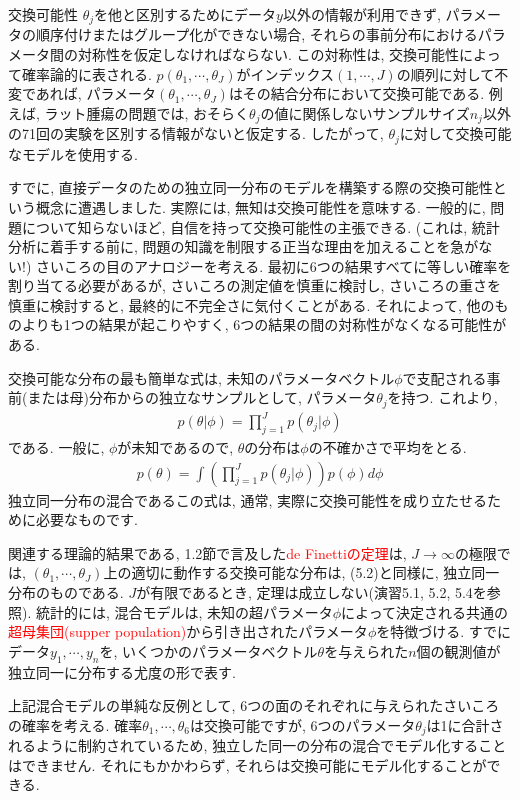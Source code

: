 \documentclass[10pt,dvipdfmx,a4]{beamer}
\newcommand{\eq}[1]{\begin{align}#1\end{align}}
\newcommand{\tcr}[1]{\textcolor{red}{#1}}
\begin{document}
\begin{frame}{交換可能性}
$\theta_j$を他と区別するためにデータ$y$以外の情報が利用できず, パラメータの順序付けまたはグループ化ができない場合, それらの事前分布におけるパラメータ間の対称性を仮定しなければならない.
この対称性は, 交換可能性によって確率論的に表される.
$p(\theta_1,\cdots,\theta_J)$がインデックス$(1,\cdots,J)$の順列に対して不変であれば, パラメータ$(\theta_1,\cdots,\theta_J)$はその結合分布において交換可能である.
例えば, ラット腫瘍の問題では, おそらく$\theta_j$の値に関係しないサンプルサイズ$n_j$以外の71回の実験を区別する情報がないと仮定する.
したがって, $\theta_j$に対して交換可能なモデルを使用する.

すでに, 直接データのための独立同一分布のモデルを構築する際の交換可能性という概念に遭遇しました.
実際には, 無知は交換可能性を意味する.
一般的に, 問題について知らないほど, 自信を持って交換可能性の主張できる.
(これは, 統計分析に着手する前に, 問題の知識を制限する正当な理由を加えることを急がない!)
さいころの目のアナロジーを考える.
最初に6つの結果すべてに等しい確率を割り当てる必要があるが, さいころの測定値を慎重に検討し, さいころの重さを慎重に検討すると, 最終的に不完全さに気付くことがある.
それによって, 他のものよりも1つの結果が起こりやすく, 6つの結果の間の対称性がなくなる可能性がある.
\end{frame}


\begin{frame}
交換可能な分布の最も簡単な式は, 未知のパラメータベクトル$\phi$で支配される事前(または母)分布からの独立なサンプルとして, パラメータ$\theta_j$を持つ.
これより,
\eq{p(\theta|\phi)=\prod_{j=1}^J p(\theta_j|\phi)}
である.
一般に, $\phi$が未知であるので, $\theta$の分布は$\phi$の不確かさで平均をとる.
\eq{p(\theta)=\int \left(\prod_{j=1}^Jp(\theta_j|\phi)\right)p(\phi)d\phi}
独立同一分布の混合であるこの式は, 通常, 実際に交換可能性を成り立たせるために必要なものです.
\end{frame}


\begin{frame}
関連する理論的結果である, 1.2節で言及した\tcr{de Finettiの定理}は, $J\rightarrow \infty$の極限では, $(\theta_1,\cdots,\theta_J)$上の適切に動作する交換可能な分布は, (5.2)と同様に, 独立同一分布のものである.
$J$が有限であるとき, 定理は成立しない(演習5.1, 5.2, 5.4を参照).
統計的には, 混合モデルは, 未知の超パラメータ$\phi$によって決定される共通の\tcr{超母集団(supper population)}から引き出されたパラメータ$\phi$を特徴づける.
すでにデータ$y_1,\cdots,y_n$を, いくつかのパラメータベクトル$\theta$を与えられた$n$個の観測値が独立同一に分布する尤度の形で表す.

上記混合モデルの単純な反例として, 6つの面のそれぞれに与えられたさいころの確率を考える.
確率$\theta_1,\cdots,\theta_6$は交換可能ですが, 6つのパラメータ$\theta_j$は1に合計されるように制約されているため, 独立した同一の分布の混合でモデル化することはできません.
それにもかかわらず, それらは交換可能にモデル化することができる.
\end{frame}
\end{document}
